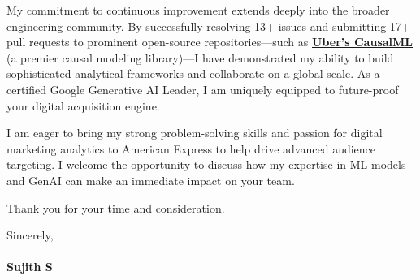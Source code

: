 \documentclass[a4paper,11pt]{article}
\newcommand{\ulink}[2]{\href{#1}{#2}}
\begin{document}
My commitment to continuous improvement extends deeply into the broader engineering community. By successfully resolving 13+ issues and submitting 17+ pull requests to prominent open-source repositories---such as \ulink{https://github.com/uber/causalml}{\textbf{Uber's CausalML}} (a premier causal modeling library)---I have demonstrated my ability to build sophisticated analytical frameworks and collaborate on a global scale. As a certified Google Generative AI Leader, I am uniquely equipped to future-proof your digital acquisition engine.

I am eager to bring my strong problem-solving skills and passion for digital marketing analytics to American Express to help drive advanced audience targeting. I welcome the opportunity to discuss how my expertise in ML models and GenAI can make an immediate impact on your team.

Thank you for your time and consideration.

Sincerely, \\
\vspace{5pt} \\
\textbf{Sujith S}
\end{document}
